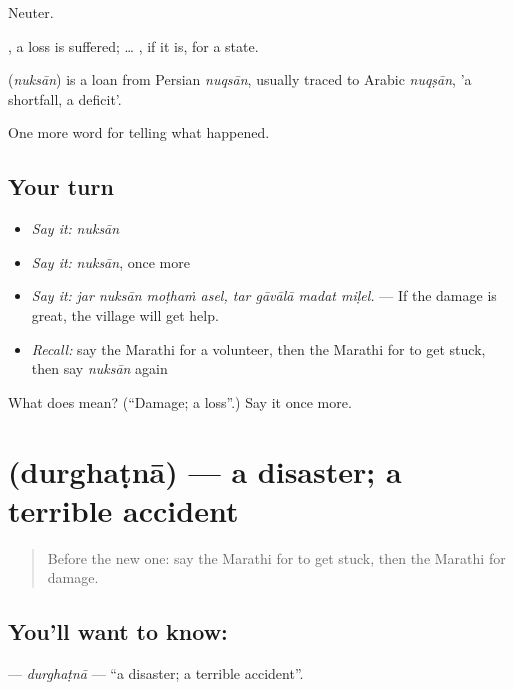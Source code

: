 Neuter.

 , a loss is suffered;  …  , if it is, for a state.

\begin{cousinweb}
\textbf{} (\emph{nuksān}) is a loan from Persian \emph{nuqsān}, usually traced to Arabic \emph{nuqṣān}, 'a shortfall, a deficit'.
\end{cousinweb}

\begin{grammarlens}[title={What you've built}]
One more word for telling what happened.
\end{grammarlens}

\subsection*{Your turn}
\begin{itemize}
\raggedright
  \item \emph{Say it:} \emph{nuksān}
  \item \emph{Say it:} \emph{nuksān}, once more
  \item \emph{Say it:} \emph{jar nuksān moṭhaṁ asel, tar gāvālā madat miḷel.} — If the damage is great, the village will get help.
  \item \emph{Recall:} say the Marathi for a volunteer, then the Marathi for to get stuck, then say \emph{nuksān} again
\end{itemize}

\begin{tcolorbox}[breakable,colback=teal!4,colframe=teal!35!black,title={Before you move on}]
What does  mean? (\textquotedblleft{}Damage; a loss\textquotedblright{}.) Say it once more.
\end{tcolorbox}
\section[\texorpdfstring{\mr{दुर्घटना} (durghaṭnā)}{दुर्घटना (durghaṭnā)}]{ (durghaṭnā) — a disaster; a terrible accident}

\label{lesson:MR-C295-durghatna}



\begin{quote}
Before the new one: say the Marathi for to get stuck, then the Marathi for damage.
\end{quote}

\subsection*{You'll want to know: }
\textbf{} — \emph{durghaṭnā} — \textquotedblleft{}a disaster; a terrible accident\textquotedblright{}.

